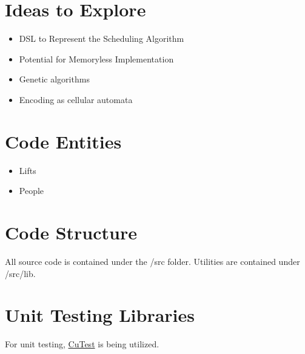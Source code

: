 \documentclass{article}
\begin{document}
\section{Ideas to Explore}
\begin{itemize}
   \item DSL to Represent the Scheduling Algorithm
   \item Potential for Memoryless Implementation
   \item Genetic algorithms
   \item Encoding as cellular automata
\end{itemize}

\section{Code Entities}
\begin{itemize}
  \item Lifts
  \item People
\end{itemize}

\section{Code Structure}
All source code is contained under the /src folder.
Utilities are contained under /src/lib.

\section{Unit Testing Libraries}
For unit testing, \href{http://cutest.sourceforge.net/}{CuTest} is being utilized.
\end{document}
